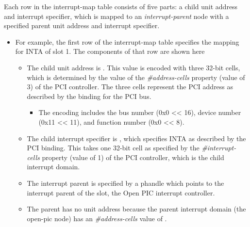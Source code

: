 \documentclass[a4paper,10pt,oneside]{sphinxmanual}
\begin{document}
Each row in the interrupt-map table consists of five parts: a child unit
address and interrupt specifier, which is mapped to an \emph{interrupt-parent}
node with a specified parent unit address and interrupt specifier.
\begin{itemize}
\item {} 
For example, the first row of the interrupt-map table specifies the
mapping for INTA of slot 1. The components of that row are shown here

\begin{itemize}
\item {} 
The child unit address is . This value is encoded
with three 32-bit cells, which is determined by the value of the
\emph{\#address-cells} property (value of 3) of the PCI controller. The
three cells represent the PCI address as described by the binding for
the PCI bus.
\begin{itemize}
\item {} 
The encoding includes the bus number (0x0 \textless{}\textless{} 16), device number
(0x11 \textless{}\textless{} 11), and function number (0x0 \textless{}\textless{} 8).

\end{itemize}

\item {} 
The child interrupt specifier is \code{\textless{}1\textgreater{}}, which specifies INTA as
described by the PCI binding. This takes one 32-bit cell as specified
by the \emph{\#interrupt-cells} property (value of 1) of the PCI
controller, which is the child interrupt domain.

\item {} 
The interrupt parent is specified by a phandle which points to the
interrupt parent of the slot, the Open PIC interrupt controller.

\item {} 
The parent has no unit address because the parent interrupt domain
(the open-pic node) has an \emph{\#address-cells} value of \code{\textless{}0\textgreater{}}.


\end{itemize}
\end{itemize}
\end{document}
